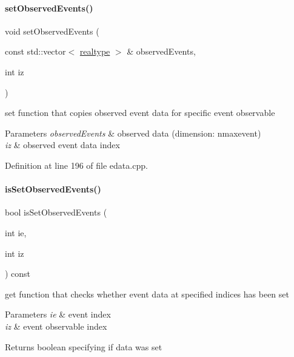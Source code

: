 \paragraph{\texorpdfstring{set\+Observed\+Events()}{setObservedEvents()}\hspace{0.1cm}{\footnotesize\ttfamily [2/2]}}
{\footnotesize\ttfamily void set\+Observed\+Events (\begin{DoxyParamCaption}\item[{const std\+::vector$<$ \mbox{\hyperlink{namespaceamici_a1bdce28051d6a53868f7ccbf5f2c14a3}{realtype}} $>$ \&}]{observed\+Events,  }\item[{int}]{iz }\end{DoxyParamCaption})}

set function that copies observed event data for specific event observable


\begin{DoxyParams}{Parameters}
{\em observed\+Events} & observed data (dimension\+: nmaxevent) \\
\hline
{\em iz} & observed event data index \\
\hline
\end{DoxyParams}


Definition at line 196 of file edata.\+cpp.

\mbox{\label{classamici_1_1_exp_data_a7270ea1362212e4dc344e24dc01b70ee}} 
\paragraph{\texorpdfstring{is\+Set\+Observed\+Events()}{isSetObservedEvents()}}
{\footnotesize\ttfamily bool is\+Set\+Observed\+Events (\begin{DoxyParamCaption}\item[{int}]{ie,  }\item[{int}]{iz }\end{DoxyParamCaption}) const}

get function that checks whether event data at specified indices has been set


\begin{DoxyParams}{Parameters}
{\em ie} & event index \\
\hline
{\em iz} & event observable index \\
\hline
\end{DoxyParams}
\begin{DoxyReturn}{Returns}
boolean specifying if data was set 
\end{DoxyReturn}


